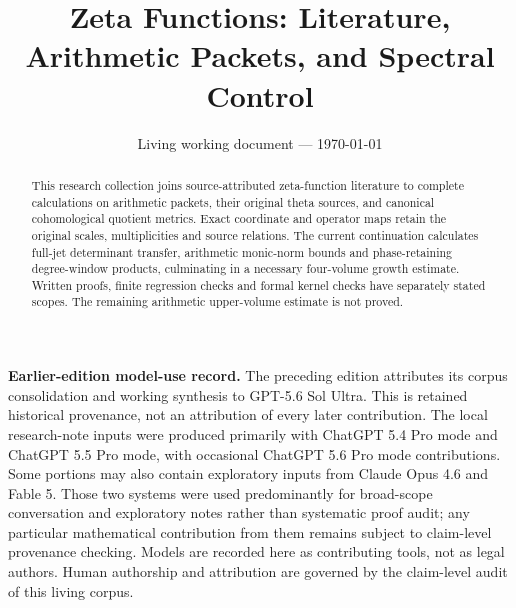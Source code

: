 \documentclass[11pt]{article}
\title{Zeta Functions: Literature, Arithmetic Packets, and Spectral Control}
\author{}
\date{Living working document --- \today}
\theoremstyle{definition}
\theoremstyle{remark}
\theoremstyle{plain}
\theoremstyle{definition}
\theoremstyle{remark}
\begin{document}
\maketitle

\begin{center}
\begin{minipage}{0.92\textwidth}
\small
\textbf{Earlier-edition model-use record.}
The preceding edition attributes its corpus consolidation and working synthesis to
GPT-5.6 Sol Ultra. This is retained historical provenance, not an attribution of every later contribution.  The local research-note inputs were produced primarily
with ChatGPT 5.4 Pro mode and ChatGPT 5.5 Pro mode, with occasional ChatGPT 5.6
Pro mode contributions.  Some portions may also contain exploratory inputs from
Claude Opus 4.6 and Fable 5.  Those two systems were used predominantly for
broad-scope conversation and exploratory notes rather than systematic proof
audit; any particular mathematical contribution from them remains subject to
claim-level provenance checking.  Models are recorded here as contributing
tools, not as legal authors.  Human authorship and attribution are governed by
the claim-level audit of this living corpus.
\end{minipage}
\end{center}

\begin{abstract}
This research collection joins source-attributed zeta-function literature
to complete calculations on arithmetic packets, their original theta
sources, and canonical cohomological quotient metrics. Exact coordinate
and operator maps retain the original scales, multiplicities and source
relations. The current continuation calculates full-jet determinant
transfer, arithmetic monic-norm bounds and phase-retaining degree-window
products, culminating in a necessary four-volume growth estimate. Written
proofs, finite regression checks and formal kernel checks have separately
stated scopes. The remaining arithmetic upper-volume estimate is not proved.
\end{abstract}



\tableofcontents
\end{document}
